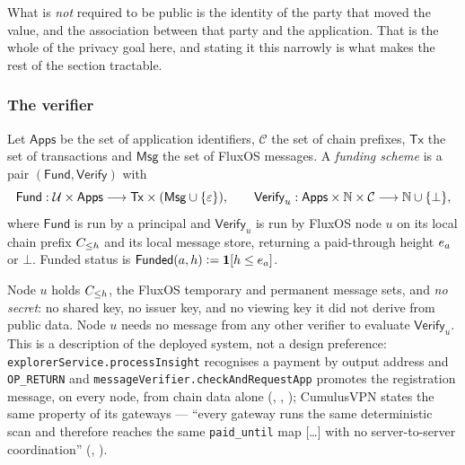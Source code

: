 What is \emph{not} required to be public is the identity of the party that moved the value, and the
association between that party and the application. That is the whole of the privacy goal here, and
stating it this narrowly is what makes the rest of the section tractable.

\subsubsection{The verifier}

\begin{definition}
\label{def:pp-scheme}
Let $\mathsf{Apps}$ be the set of application identifiers, $\mathcal{C}$ the set of chain prefixes,
$\mathsf{Tx}$ the set of transactions and $\mathsf{Msg}$ the set of FluxOS messages. A \emph{funding
scheme} is a pair $(\mathsf{Fund}, \mathsf{Verify})$ with
\[
  \mathsf{Fund} : \mathcal{U} \times \mathsf{Apps} \longrightarrow \mathsf{Tx} \times (\mathsf{Msg} \cup \{\varepsilon\}),
  \qquad
  \mathsf{Verify}_u : \mathsf{Apps} \times \mathbb{N} \times \mathcal{C} \longrightarrow \mathbb{N} \cup \{\bot\},
\]
where $\mathsf{Fund}$ is run by a principal and $\mathsf{Verify}_u$ is run by FluxOS node $u$ on its
local chain prefix $C_{\le h}$ and its local message store, returning a paid-through height $e_{a}$
or $\bot$. Funded status is $\mathsf{Funded}(a,h) \vcentcolon= \mathbf{1}\!\left[h \le e_{a}\right]$.
\end{definition}

\begin{assumption}
\label{ass:pp-verifier}
Node $u$ holds $C_{\le h}$, the FluxOS temporary and permanent message sets, and \emph{no secret}:
no shared key, no issuer key, and no viewing key it did not derive from public data. Node $u$ needs no
message from any other verifier to evaluate $\mathsf{Verify}_u$. This is a description of the deployed
system, not a design preference: \texttt{explorerService.\allowbreak{}processInsight} recognises a payment by output
address and \texttt{OP\_RETURN} and \texttt{messageVerifier.\allowbreak{}checkAndRequestApp} promotes the
registration message, on every node, from chain data alone (\shipped,
,
); CumulusVPN states the same property
of its gateways --- ``every gateway runs the same deterministic scan and therefore reaches the same
\texttt{paid\_until} map [\ldots] with no server-to-server coordination'' (\shipped, ).
\end{assumption}


